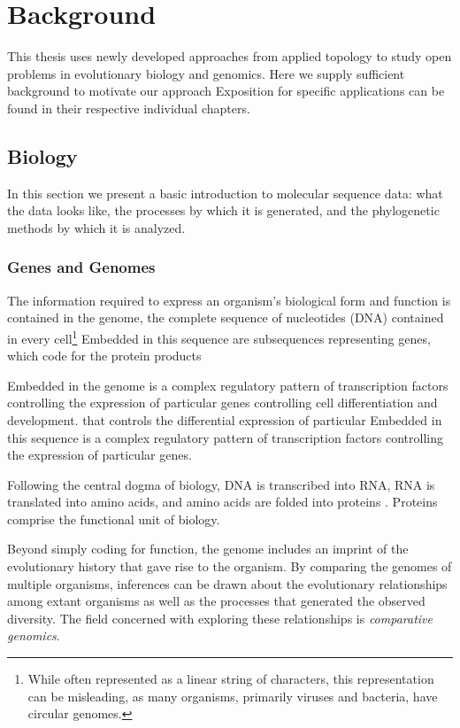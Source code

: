 \chapter{Background}
\label{ch:background}

This thesis uses newly developed approaches from applied topology to study open problems in evolutionary biology and genomics.
Here we supply sufficient background to motivate our approach
Exposition for specific applications can be found in their respective individual chapters.

\section{Biology}

In this section we present a basic introduction to molecular sequence data: what the data looks like, the processes by which it is generated, and the phylogenetic methods by which it is analyzed.

\subsection{Genes and Genomes}

The information required to express an organism's biological form and function is contained in the genome, the complete sequence of nucleotides (DNA) contained in every cell\footnote{While often represented as a linear string of characters, this representation can be misleading, as many organisms, primarily viruses and bacteria, have circular genomes.}
Embedded in this sequence are subsequences representing genes, which code for the protein products

Embedded in the genome is a complex regulatory pattern of transcription factors controlling the expression of particular genes controlling cell differentiation and development.
that controls the differential expression of particular 
Embedded in this sequence is a complex regulatory pattern of transcription factors controlling the expression of particular genes.

Following the central dogma of biology, DNA is transcribed into RNA, RNA is translated into amino acids, and amino acids are folded into proteins \cite{Crick:1970wb}.
Proteins comprise the functional unit of biology.

Beyond simply coding for function, the genome includes an imprint of the evolutionary history that gave rise to the organism.
By comparing the genomes of multiple organisms, inferences can be drawn about the evolutionary relationships among extant organisms as well as the processes that generated the observed diversity.
The field concerned with exploring these relationships is \emph{comparative genomics}.

